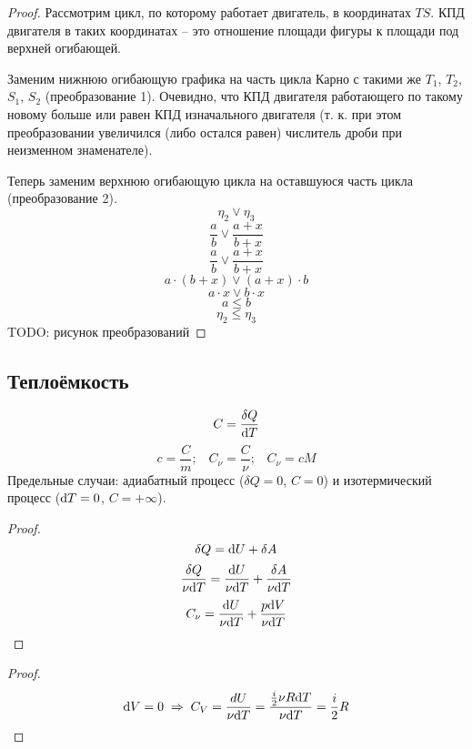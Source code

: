 \begin{proof}
Рассмотрим цикл, по которому работает двигатель, в координатах $TS$. КПД двигателя в таких координатах -- это отношение площади фигуры к площади под верхней огибающей.\par
Заменим нижнюю огибающую графика на часть цикла Карно с такими же $T_1$, $T_2$, $S_1$, $S_2$ (преобразование 1). Очевидно, что КПД двигателя работающего по такому новому больше или равен КПД изначального двигателя (т. к. при этом преобразовании увеличился (либо остался равен) числитель дроби при неизменном знаменателе).\par
Теперь заменим верхнюю огибающую цикла на оставшуюся часть цикла (преобразование 2).
\[ \eta_{2} \vee \eta_{3} \]
\[ \frac{a}{b} \vee \frac{a+x}{b+x} \]
\[ \frac{a}{b} \vee \frac{a+x}{b+x} \]
\[ a \cdot (b+x) \vee (a+x) \cdot b \]
\[ a \cdot x \vee b \cdot x \]
\[ a \le b \]
\[ \eta_{2} \le \eta_{3} \]
TODO: рисунок преобразований
\end{proof}



\subsection{Теплоёмкость}
\[C=\frac{\delta Q}{\text{d} T}\]
\[c = \frac{C}{m} \text{;} \quad
C_\nu = \frac{C}{\nu} \text{;} \quad
C_\nu = cM\]
Предельные случаи: адиабатный процесс ($\delta Q = 0$, $C = 0$) и изотермический процесс ($\text{d} T = 0$, $C = +\infty$).\par


\begin{proof}
\[\delta Q = \text{d} U + \delta A\]
\[\frac{\delta Q}{\nu \text{d} T} = \frac{\text{d} U}{\nu \text{d} T} + \frac{\delta A}{\nu \text{d} T}\]
\[C_\nu=\frac{\text{d} U}{\nu \text{d} T} + \frac{p \text{d} V}{\nu \text{d} T}\]
\end{proof}

\begin{proof}
	\[\text{d} V = 0 \;\Rightarrow\; C_V = \frac{dU}{\nu \text{d} T} = \frac{\frac{i}{2}\nu R \text{d} T}{\nu \text{d} T} = \frac{i}{2}R \]
\end{proof}

